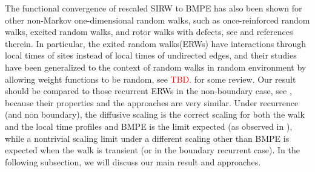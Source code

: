 \documentclass[twoside,12pt,a4paper]{article}
\numberwithin{equation}{section}
\newcommand\TBD{\textcolor{red}{TBD.}}
\begin{document}
	  
	The functional convergence of rescaled SIRW to BMPE has also been shown for other non-Markov one-dimensional random walks,
	 such as once-reinforced random walks, excited random walks, and rotor walks with defects, see \cite{Dav96,Dav99,DK12,KP16,KMP22B,HLSH18} and references therein. In particular, the exited random walks(ERWs) have interactions through local times of sites instead of local times of undirected edges, and their studies have been generalized to the context of random walks in random environment by allowing weight functions to be random, see \TBD \cite{KZ13, KMP22B}  for some review. Our result should be compared to those recurrent ERWs in the non-boundary case, see \cite{KP16,KMP22B}, because their properties and the approaches are very similar. Under recurrence (and non boundary), the diffusive scaling is the correct scaling for both the walk and the local time profiles and BMPE is the limit expected (as observed in \cite{T96}), while a nontrivial scaling limit under a different scaling other than BMPE is expected when the walk is transient (or in the boundary recurrent case). In the following subsection, we will discuss our main result and approaches.
	 
\end{document}
